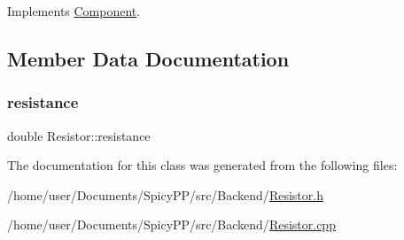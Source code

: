 Implements \hyperlink{classComponent_a7c6ba16177143bc9945583a9c3df4c89}{Component}.



\subsection{Member Data Documentation}
\mbox{\label{classResistor_ac940c96f396ad2ad276d03c60106ebe4}} 
\subsubsection{\texorpdfstring{resistance}{resistance}}
{\footnotesize\ttfamily double Resistor\+::resistance\hspace{0.3cm}{\ttfamily [private]}}



The documentation for this class was generated from the following files\+:\begin{DoxyCompactItemize}
\item 
/home/user/\+Documents/\+Spicy\+P\+P/src/\+Backend/\hyperlink{Resistor_8h}{Resistor.\+h}\item 
/home/user/\+Documents/\+Spicy\+P\+P/src/\+Backend/\hyperlink{Resistor_8cpp}{Resistor.\+cpp}\end{DoxyCompactItemize}
